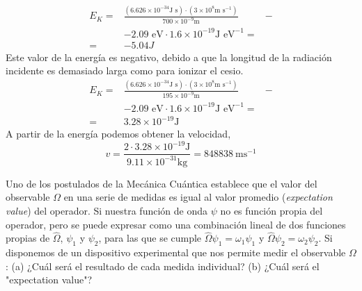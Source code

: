 \documentclass[addpoints,spanish, 12pt,a4paper]{exam}
\begin{document}
\begin{questions}
\begin{solution}
        \begin{align*}
            E_K =&\frac{(6.626\times10^{-34}\textrm{J s})
            \cdot (3\times10^8\textrm{m s}^{-1})}{700\times 10^{-9}\mathrm{m}}& - \\ &-2.09\textrm{ eV}\cdot1.6\times 10^{-19} \textrm{J eV}^{-1}=\\
            =&-5.04 J
        \end{align*}
        Este valor de la energía es negativo, debido a que
        la longitud de la radiación incidente es demasiado
        larga como para ionizar el cesio.
        \begin{align*}
            E_K =&\frac{(6.626\times10^{-34}\textrm{J s})
            \cdot (3\times10^8\textrm{m s}^{-1})}{195\times 10^{-9}\mathrm{m}}& - \\&-2.09\textrm{ eV}\cdot1.6\times 10^{-19} \textrm{J eV}^{-1}=\\
            =& 3.28\times10^{-19} \mathrm{J}
        \end{align*}
        A partir de la energía podemos obtener la velocidad,
        \begin{equation*}
            v=\frac{2\cdot3.28\times10^{-19} \mathrm{J}}{9.11\times10^{-31}\mathrm{kg}}=848838\mathrm{~ m s}^{-1}
        \end{equation*}
    \vspace*{5\baselineskip}
    \end{solution}
    
    \question[1\half] Uno de los postulados de la Mecánica
    Cuántica establece que el valor 
    del observable $\Omega$ en una serie de medidas es 
    igual al valor promedio (\textit{expectation value})
    del operador. Si nuestra función de onda $\psi$ no
    es función propia del operador, pero se puede expresar
    como una combinación lineal de dos funciones propias 
    de $\hat{\Omega}$, $\psi_1$ y $\psi_2$, para las que se
    cumple $\hat{\Omega}\psi_1=\omega_1\psi_1$ y
    $\hat{\Omega}\psi_2=\omega_2\psi_2$. Si disponemos
    de un dispositivo experimental que nos permite medir
    el observable $\Omega$: (a) ¿Cuál será el resultado de
    cada medida individual? (b) ¿Cuál será el "expectation
    value"?
    

\end{questions}
\end{document}
